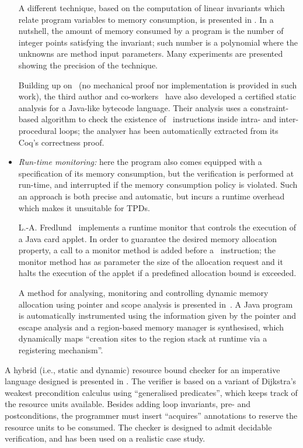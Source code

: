 \begin{itemize}
A different technique, based on the computation of linear invariants
which relate program variables to memory consumption, is presented in
\cite{BGS05sps}. In a nutshell, the amount of  memory consumed by a
program is the number of integer points satisfying the invariant; such
number is a polynomial where the unknowns are method input
parameters. Many experiments are presented showing the precision of
the technique.


Building up on~\cite{schneider04cba} (no mechanical proof nor
implementation is provided in such work), the third author and
co-workers~\cite{CJPS05cmu} have also developed a certified static
analysis for a Java-like bytecode language. Their analysis uses a
constraint-based algorithm to check the existence of \new\
instructions inside intra- and inter-procedural loops; the analyser has been automatically extracted from its Coq's correctness proof.



\item \emph{Run-time monitoring:} here the program also comes equipped
with a specification of its memory consumption, but the verification
is performed at run-time, and interrupted if the memory consumption
policy is violated. Such an approach is both precise and automatic,
but incurs a runtime overhead which makes it unsuitable for TPDs.

L.-A. Fredlund~\cite{fredlund04gcp} implements a runtime monitor that
controls the execution of a Java card applet.  In order to guarantee
the desired memory allocation property, a call to a monitor method is
added before a \new\ instruction; the monitor method has as parameter
the size of the allocation request and it halts the execution of the
applet if a predefined allocation bound is exceeded.

A method for analysing, monitoring and controlling dynamic memory
allocation using pointer and scope analysis is presented
in~\cite{GNYZ04pir}. A Java program is automatically instrumented
using the information given by the pointer and escape analysis and a
region-based memory manager is synthesised, which dynamically maps ``creation sites to the region stack at runtime via a registering mechanism''.

\end{itemize}
A hybrid (i.e., static and dynamic) resource bound checker for an
imperative language designed is presented in \cite{CEILN05}. The
verifier is based on a variant of Dijkstra's weakest precondition
calculus using ``generalised predicates'', which keeps track of the
resource units available. Besides adding loop invariants, pre- and
postconditions, the programmer must insert ``acquires'' annotations to
reserve the resource units to be consumed. The checker is designed to
admit decidable verification, and has been used on a realistic case
study.



